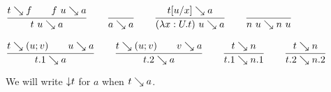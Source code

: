 \documentclass[a4paper,english]{lipics-utf8x}
\begin{document}
\begin{center}
\(
  \ru{t \rew f \qquad
      f~u \rew a
    }{t~u \rew a}
  \qquad
  \ru{}{a \rew a}
  \qquad
  \ru{t[u/x] \rew a
    }{(\lambda x:U.t)~u \rew a}
  \qquad
  \ru{}{n~u \rew n~u}
\)
\end{center}

\begin{center}
\(
  \ru{t \rew (u;v) \qquad
      u \rew a
    }{t.1 \rew a}
  \qquad
  \ru{t \rew (u;v) \qquad
      v \rew a
    }{t.2 \rew a}
  \qquad
  \ru{t \rew n
    }{t.1 \rew n.1}
  \qquad
  \ru{t \rew n
    }{t.2 \rew n.2}
\)
\end{center}
%
We will write ${\downarrow} t$ for $a$ when $t \searrow a$.
\end{document}
